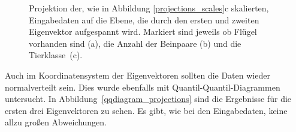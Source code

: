  \begin{figure}
  \qquad
  \qquad
  
  \caption{Projektion der, wie in Abbildung \ref{projections_scales}c skalierten, Eingabedaten auf die Ebene, die durch den ersten und zweiten Eigenvektor aufgespannt wird. Markiert sind jeweils ob Flügel vorhanden sind (a), die Anzahl der Beinpaare (b) und die \mbox{Tierklasse (c)}.}
  \label{projections_tags}
 \end{figure}
 
 
 Auch im Koordinatensystem der Eigenvektoren sollten die Daten wieder normalverteilt sein. Dies wurde ebenfalls mit Quantil-Quantil-Diagrammen untersucht. In \mbox{Abbildung \ref{qqdiagram_projections}} sind die Ergebnisse für die ersten drei Eigenvektoren zu sehen. Es gibt, wie bei den Eingabedaten, keine allzu großen Abweichungen.
 
